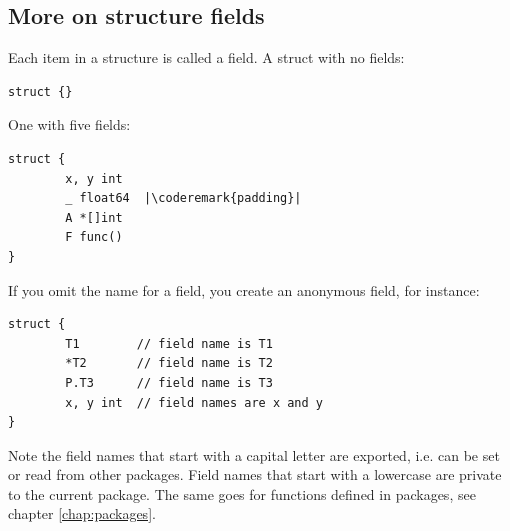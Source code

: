 \subsection{More on structure fields}
Each item in a structure is called a field. 
A struct with no fields:
\begin{lstlisting}
struct {}
\end{lstlisting}
One with five fields:
\begin{lstlisting}
struct {
        x, y int
        _ float64  |\coderemark{padding}|
        A *[]int
        F func()
}
\end{lstlisting}
If you omit the name for a field, you create an anonymous field, for
instance:
\begin{lstlisting}
struct {
        T1        // field name is T1
        *T2       // field name is T2
        P.T3      // field name is T3
        x, y int  // field names are x and y
}
\end{lstlisting}
Note the field names that start with a capital letter are exported, i.e. can be
set or read from other packages. Field names that start with a lowercase are private
to the current package. The same goes for functions defined in packages, see chapter
\ref{chap:packages}.

